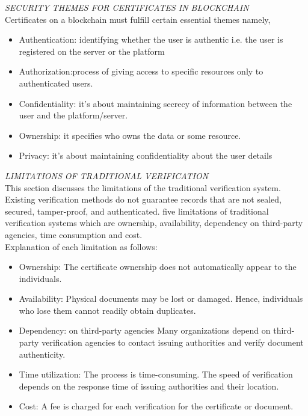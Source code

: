 \textit{SECURITY THEMES FOR CERTIFICATES IN BLOCKCHAIN\\}
Certificates on a blockchain must fulfill certain essential themes namely,
\begin{itemize}
    \item Authentication: identifying whether the user is authentic i.e. the user is registered on the server or the platform
    \item Authorization:process of giving access to specific resources only to authenticated users.
    \item Confidentiality: it's about maintaining secrecy of information between the user and the platform/server.
    \item Ownership: it specifies who owns the data or some resource.
    \item Privacy: it's about maintaining confidentiality about the user details
\end{itemize}

\vspace{1cm}

\textit{LIMITATIONS OF TRADITIONAL VERIFICATION\\}
This section discusses the limitations of the traditional verification system. Existing verification methods do not guarantee records that are not sealed, secured, tamper-proof, and authenticated. five limitations of traditional verification systems which are ownership, availability, dependency on third-party agencies, time consumption and cost. \\
Explanation of each limitation as follows:
\begin{itemize}
    \item Ownership:
The certificate ownership does not automatically appear to the individuals.
\item Availability:
Physical documents may be lost or damaged. Hence, individuals who lose them cannot readily obtain duplicates.
\item Dependency: on third-party agencies
Many organizations depend on third-party verification agencies to contact issuing authorities and verify document authenticity.
\item Time utilization:
The process is time-consuming. The speed of verification depends on the response time of issuing authorities and their location.
\item Cost:
A fee is charged for each verification for the certificate or document.
\end{itemize}


